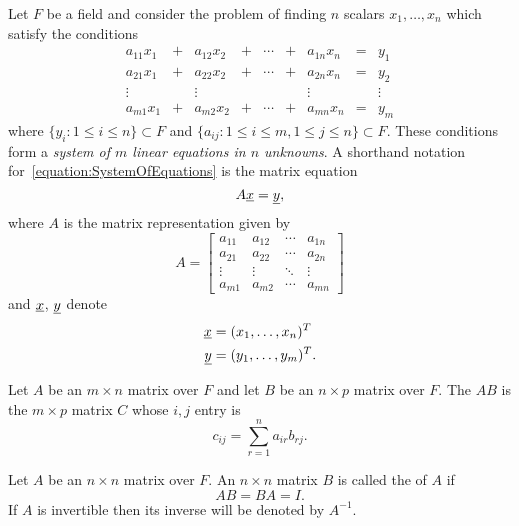 Let $F$ be a field and consider the problem of finding $n$ scalars $x_1, \ldots, x_n$ which satisfy the conditions
\begin{equation} \label{equation:SystemOfEquations}
\begin{array}{ccccccccc}
a_{11} x_1 & + & a_{12} x_2 & + & \cdots & + & a_{1n} x_n & = & y_1 \\
a_{21} x_1 & + & a_{22} x_2 & + & \cdots & + & a_{2n} x_n & = & y_2 \\
\vdots & & \vdots  & & & & \vdots & & \vdots \\
a_{m1} x_1 & + & a_{m2} x_2 & + & \cdots & + & a_{mn} x_n & = & y_m
\end{array}
\end{equation}
where $\{ y_i : 1 \leq i \leq n \} \subset F$ and $\{ a_{ij} : 1 \leq i \leq m, 1 \leq j \leq n \} \subset F$.
These conditions form a \emph{system of $m$ linear equations in $n$ unknowns}.
A shorthand notation for~\eqref{equation:SystemOfEquations} is the matrix equation
\begin{equation*}
A \underline{x} = \underline{y},
\end{equation*}
where $A$ is the matrix representation given by
\begin{equation*}
A = \left[ \begin{array}{cccc}
a_{11} & a_{12} & \cdots & a_{1n} \\
a_{21} & a_{22} & \cdots & a_{2n} \\
\vdots & \vdots & \ddots & \vdots \\
a_{m1} & a_{m2} & \cdots & a_{mn}
\end{array} \right]
\end{equation*}
and $\underline{x}$, $\underline{y}$ denote
\begin{align*}
\underline{x} &= (x_1, \ldots, x_n)^T \\
\underline{y} &= (y_1, \ldots, y_m)^T .
\end{align*}

\begin{definition}
Let $A$ be an $m \times n$ matrix over $F$ and let $B$ be an $n \times p$ matrix over $F$.
The  $AB$ is the $m \times p$ matrix $C$ whose $i,j$ entry is
\begin{equation*}
c_{ij} = \sum_{r = 1}^n a_{ir} b_{rj}.
\end{equation*}
\end{definition}

\begin{definition}
Let $A$ be an $n \times n$ matrix over $F$.
An $n \times n$ matrix $B$ is called the  of $A$ if
\begin{equation*}
AB = BA = I.
\end{equation*}
If $A$ is invertible then its inverse will be denoted by $A^{-1}$.
\end{definition}

